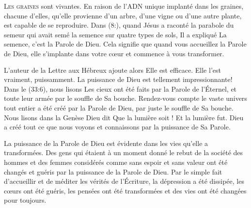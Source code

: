 



\lettrine{L}{es graines} sont vivantes.
 En raison de l'ADN unique implanté dans les graines, chacune d'elles,
 qu'elle provienne d'un arbre, d'une vigne ou d'une autre plante,
 est capable de se reproduire.
 Dans (8:), quand Jésus a raconté la parabole du semeur
 qui avait semé la semence sur quatre types de sols,
 Il a expliqué\frcolon{} 
 \Og La semence, c'est la Parole de Dieu. \Fg{}
 Cela signifie que quand vous accueillez la Parole de Dieu,
 elle s'implante dans votre c\oe{}ur et commence à vous transformer. 



L'auteur de la Lettre aux Hébreux ajoute alors\frcolon{} 
 \Og Elle est efficace. \Fg{} 
 Elle l'est vraiment, puissamment.
 La puissance de Dieu est tellement impressionnante!
 Dans le (33:6), nous lisons\frcolon{} 
 \Og Les cieux ont été faits par la Parole de l'Éternel,
 et toute leur armée par le souffle de Sa bouche. \Fg{}
 Rendez-vous compte \ocadr le vaste univers tout entier a été créé
 par la Parole de Dieu, par juste 
 le souffle de Sa bouche.
 Nous lisons dans la Genèse\frcolon{} 
 \Og Dieu dit\frcolon{} Que la lumière soit ! Et la lumière fut. \Fg{}
 Dieu a créé tout ce que nous voyons et connaissons
 par la puissance de Sa Parole. 

La puissance de la Parole de Dieu est évidente dans les vies
 qu'elle a transformées. Des gens qui étaient à un moment donné
 le rebut de la société \ocadr des hommes et des femmes considérés
 comme sans espoir et sans valeur \fcadr{} ont été changés et guéris
 par la puissance de la Parole de Dieu.
 Par le simple fait d'accueillir et de méditer les vérités de l'Écriture,
 la dépression a été dissipée, les c\oe{}urs ont été guéris,
 les pensées ont été transformées et des vies ont été changées
 \ocadr pour toujours. 

\dvrule

